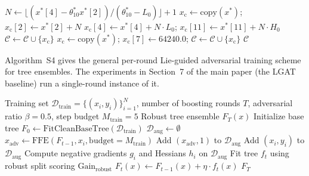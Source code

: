 \begin{algorithm}[!t]
\begin{algorithmic}[1]
    \STATE $N \leftarrow \lfloor (x^*[4] - \theta_{10}^* x^*[2]) / (\theta_{10}^* - L_0) \rfloor + 1$
        \STATE {}
        \STATE $x_{\text{c}} \leftarrow \text{copy}(x^*)$; $x_{\text{c}}[2] \leftarrow x^*[2] + N$
        \STATE $x_{\text{c}}[4] \leftarrow x^*[4] + N \cdot L_0$; $x_{\text{c}}[11] \leftarrow x^*[11] + N \cdot H_0$
        \STATE $\mathcal{C} \leftarrow \mathcal{C} \cup \{x_{\text{c}}\}$
    \ENDIF
\ENDIF
\STATE {}
    \STATE $x_{\text{c}} \leftarrow \text{copy}(x^*)$; $x_{\text{c}}[7] \leftarrow 64240.0$; $\mathcal{C} \leftarrow \mathcal{C} \cup \{x_{\text{c}}\}$
\ENDIF
\RETURN $\mathcal{C}$
\end{algorithmic}
\end{algorithm}

Algorithm~S4 gives the general per-round Lie-guided adversarial training scheme for tree ensembles. The experiments in Section~7 of the main paper (the LGAT baseline) run a single-round instance of it.

\begin{algorithm}[!t]
\footnotesize\linespread{1}\selectfont
\caption{Lie-Guided Adversarial Training (LGAT) for Tree Ensembles}
\label{alg:lgat}
\begin{algorithmic}[1]
\REQUIRE Training set $\mathcal{D}_{\text{train}} = \{(x_i, y_i)\}_{i=1}^N$, number of boosting rounds $T$, adversarial ratio $\beta = 0.5$, step budget $M_{\text{train}} = 5$
\ENSURE Robust tree ensemble $F_T(x)$
\STATE Initialize base tree $F_0 \leftarrow \text{FitCleanBaseTree}(\mathcal{D}_{\text{train}})$
    \STATE $\mathcal{D}_{\text{aug}} \leftarrow \emptyset$
            \STATE $x_{\text{adv}} \leftarrow \text{FFE}(F_{t-1}, x_i, \text{budget}=M_{\text{train}})$
            \STATE Add $(x_{\text{adv}}, 1)$ to $\mathcal{D}_{\text{aug}}$
        \ELSE
            \STATE Add $(x_i, y_i)$ to $\mathcal{D}_{\text{aug}}$
        \ENDIF
    \ENDFOR
    \STATE Compute negative gradients $g_i$ and Hessians $h_i$ on $\mathcal{D}_{\text{aug}}$
    \STATE Fit tree $f_t$ using robust split scoring $\text{Gain}_{\text{robust}}$
    \STATE $F_t(x) \leftarrow F_{t-1}(x) + \eta \cdot f_t(x)$
\ENDFOR
\RETURN $F_T$
\end{algorithmic}
\end{algorithm}
